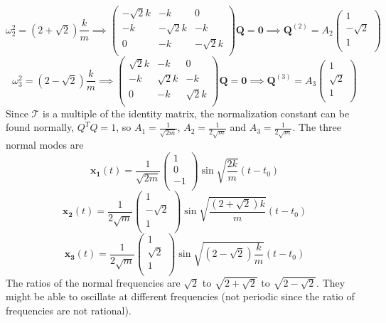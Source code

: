 \documentclass[a4paper]{article}
\begin{document}
\begin{ans}
$$\omega_2^2=(2+\sqrt{2})\frac{k}{m}\implies\begin{pmatrix}-\sqrt{2}k&-k&0\\-k&-\sqrt{2}k&-k\\0&-k&-\sqrt{2}k\\\end{pmatrix}\mathbf{Q}=\boldsymbol{0}\implies\mathbf{Q}^{(2)}=A_2\begin{pmatrix}1\\-\sqrt{2}\\1\\\end{pmatrix}$$
$$\omega_3^2=(2-\sqrt{2})\frac{k}{m}\implies\begin{pmatrix}\sqrt{2}k&-k&0\\-k&\sqrt{2}k&-k\\0&-k&\sqrt{2}k\\\end{pmatrix}\mathbf{Q}=\boldsymbol{0}\implies\mathbf{Q}^{(3)}=A_3\begin{pmatrix}1\\\sqrt{2}\\1\\\end{pmatrix}$$
Since $\mathcal{T}$ is a multiple of the identity matrix, the normalization constant can be found normally, $Q^TQ=1$, so $A_1=\frac{1}{\sqrt{2m}}$, $A_2=\frac{1}{2\sqrt{m}}$ and $A_3=\frac{1}{2\sqrt{m}}$. The three normal modes are
$$\mathbf{x_1}(t)=\frac{1}{\sqrt{2m}}\begin{pmatrix}1\\0\\-1\\\end{pmatrix}\sin\sqrt{\frac{2k}{m}}(t-t_0)$$
$$\mathbf{x_2}(t)=\frac{1}{2\sqrt{m}}\begin{pmatrix}1\\-\sqrt{2}\\1\\\end{pmatrix}\sin\sqrt{\frac{(2+\sqrt{2})k}{m}}(t-t_0)$$
$$\mathbf{x_3}(t)=\frac{1}{2\sqrt{m}}\begin{pmatrix}1\\\sqrt{2}\\1\\\end{pmatrix}\sin\sqrt{(2-\sqrt{2})\frac{k}{m}}(t-t_0)$$
The ratios of the normal frequencies are $\sqrt{2}$ to $\sqrt{2+\sqrt{2}}$ to $\sqrt{2-\sqrt{2}}$. They might be able to oscillate at different frequencies (not periodic since the ratio of frequencies are not rational).
\end{ans}
\end{document}
